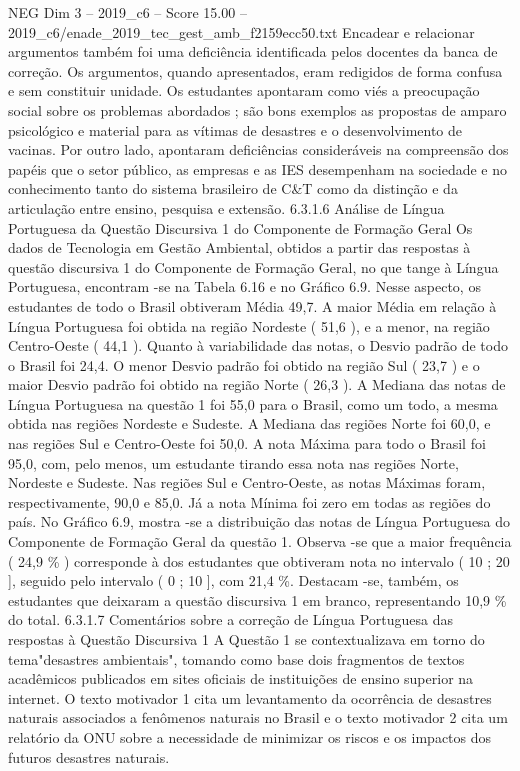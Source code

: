 \begin{textsample}{NEG Dim 3 – 2019\_c6 – Score 15.00 – 2019\_c6/enade\_2019\_tec\_gest\_amb\_f2159ecc50.txt}
Encadear e relacionar argumentos também foi uma deficiência identificada pelos docentes da banca de correção.
Os argumentos, quando apresentados, eram redigidos de forma confusa e sem constituir unidade.
Os estudantes apontaram como viés a preocupação social sobre os problemas abordados ; são bons exemplos as propostas de amparo psicológico e material para as vítimas de desastres e o desenvolvimento de vacinas.
Por outro lado, apontaram deficiências consideráveis na compreensão dos papéis que o setor público, as empresas e as IES desempenham na sociedade e no conhecimento tanto do sistema brasileiro de C\&T como da distinção e da articulação entre ensino, pesquisa e extensão. 6.3.1.6 Análise de Língua Portuguesa da Questão Discursiva 1 do Componente de Formação Geral Os dados de Tecnologia em Gestão Ambiental, obtidos a partir das respostas à questão discursiva 1 do Componente de Formação Geral, no que tange à Língua Portuguesa, encontram -se na Tabela 6.16 e no Gráfico 6.9.
Nesse aspecto, os estudantes de todo o Brasil obtiveram Média 49,7.
A maior Média em relação à Língua Portuguesa foi obtida na região Nordeste ( 51,6 ), e a menor, na região Centro-Oeste ( 44,1 ).
Quanto à variabilidade das notas, o Desvio padrão de todo o Brasil foi 24,4.
O menor Desvio padrão foi obtido na região Sul ( 23,7 ) e o maior Desvio padrão foi obtido na região Norte ( 26,3 ).
A Mediana das notas de Língua Portuguesa na questão 1 foi 55,0 para o Brasil, como um todo, a mesma obtida nas regiões Nordeste e Sudeste.
A Mediana das regiões Norte foi 60,0, e nas regiões Sul e Centro-Oeste foi 50,0.
A nota Máxima para todo o Brasil foi 95,0, com, pelo menos, um estudante tirando essa nota nas regiões Norte, Nordeste e Sudeste.
Nas regiões Sul e Centro-Oeste, as notas Máximas foram, respectivamente, 90,0 e 85,0.
Já a nota Mínima foi zero em todas as regiões do país.
No Gráfico 6.9, mostra -se a distribuição das notas de Língua Portuguesa do Componente de Formação Geral da questão 1.
Observa -se que a maior frequência ( 24,9 \% ) corresponde à dos estudantes que obtiveram nota no intervalo ( 10 ; 20 ], seguido pelo intervalo ( 0 ; 10 ], com 21,4 \%.
Destacam -se, também, os estudantes que deixaram a questão discursiva 1 em branco, representando 10,9 \% do total. 6.3.1.7 Comentários sobre a correção de Língua Portuguesa das respostas à Questão Discursiva 1 A Questão 1 se contextualizava em torno do tema"desastres ambientais", tomando como base dois fragmentos de textos acadêmicos publicados em sites oficiais de instituições de ensino superior na internet.
O texto motivador 1 cita um levantamento da ocorrência de desastres naturais associados a fenômenos naturais no Brasil e o texto motivador 2 cita um relatório da ONU sobre a necessidade de minimizar os riscos e os impactos dos futuros desastres naturais.

\end{textsample}
